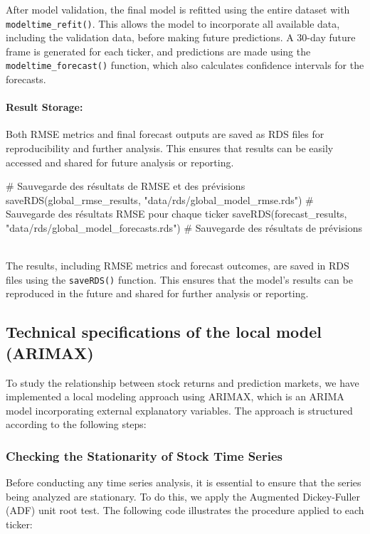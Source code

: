 \documentclass[12pt]{report}
\begin{document}
After model validation, the final model is refitted using the entire dataset with \texttt{modeltime\_refit()}. This allows the model to incorporate all available data, including the validation data, before making future predictions. A 30-day future frame is generated for each ticker, and predictions are made using the \texttt{modeltime\_forecast()} function, which also calculates confidence intervals for the forecasts.

\paragraph{Result Storage:}
Both RMSE metrics and final forecast outputs are saved as RDS files for reproducibility and further analysis. This ensures that results can be easily accessed and shared for future analysis or reporting.\\

\begin{code}
# Sauvegarde des résultats de RMSE et des prévisions
saveRDS(global_rmse_results, "data/rds/global_model_rmse.rds")
# Sauvegarde des résultats RMSE pour chaque ticker
saveRDS(forecast_results, "data/rds/global_model_forecasts.rds")
# Sauvegarde des résultats de prévisions
\end{code}\\

The results, including RMSE metrics and forecast outcomes, are saved in RDS files using the \texttt{saveRDS()} function. This ensures that the model's results can be reproduced in the future and shared for further analysis or reporting.


\subsection{Technical specifications of the local model (ARIMAX)}
To study the relationship between stock returns and prediction markets, we have implemented a local modeling approach using ARIMAX, which is an ARIMA model incorporating external explanatory variables. The approach is structured according to the following steps:

\subsubsection{Checking the Stationarity of Stock Time Series}

Before conducting any time series analysis, it is essential to ensure that the series being analyzed are stationary. To do this, we apply the Augmented Dickey-Fuller (ADF) unit root test. The following code illustrates the procedure applied to each ticker:\\
\end{document}
